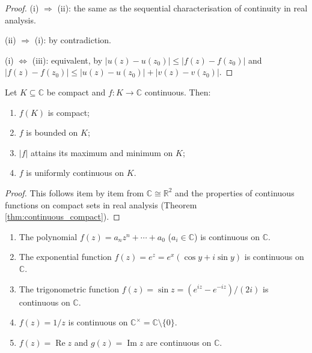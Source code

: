 \begin{proof}
(i) $\Rightarrow$ (ii): the same as the sequential characterisation of continuity in real analysis.

(ii) $\Rightarrow$ (i): by contradiction.

(i) $\Leftrightarrow$ (iii): equivalent, by $|u(z) - u(z_0)| \le |f(z) - f(z_0)|$ and $|f(z) - f(z_0)| \le |u(z) - u(z_0)| + |v(z) - v(z_0)|$.
\end{proof}

\begin{theorem}\label{thm:ca_continuous_compact}
Let $K \subseteq \mathbb{C}$ be compact and $f: K \to \mathbb{C}$ continuous. Then:
\begin{enumerate}[label=(\roman*)]
    \item $f(K)$ is compact;
    \item $f$ is bounded on $K$;
    \item $|f|$ attains its maximum and minimum on $K$;
    \item $f$ is uniformly continuous on $K$.
\end{enumerate}
\end{theorem}

\begin{proof}
This follows item by item from $\mathbb{C} \cong \mathbb{R}^2$ and the properties of continuous functions on compact sets in real analysis (Theorem \ref{thm:continuous_compact}).
\end{proof}

\begin{example}\label{ex:ca_function_examples}
\begin{enumerate}[label=(\roman*)]
    \item The polynomial $f(z) = a_n z^n + \cdots + a_0$ ($a_i \in \mathbb{C}$) is continuous on $\mathbb{C}$.
    \item The exponential function $f(z) = e^z = e^x (\cos y + i \sin y)$ is continuous on $\mathbb{C}$.
    \item The trigonometric function $f(z) = \sin z = (e^{iz} - e^{-iz})/(2i)$ is continuous on $\mathbb{C}$.
    \item $f(z) = 1/z$ is continuous on $\mathbb{C}^\times = \mathbb{C} \setminus \{0\}$.
    \item $f(z) = \operatorname{Re} z$ and $g(z) = \operatorname{Im} z$ are continuous on $\mathbb{C}$.
\end{enumerate}
\end{example}

